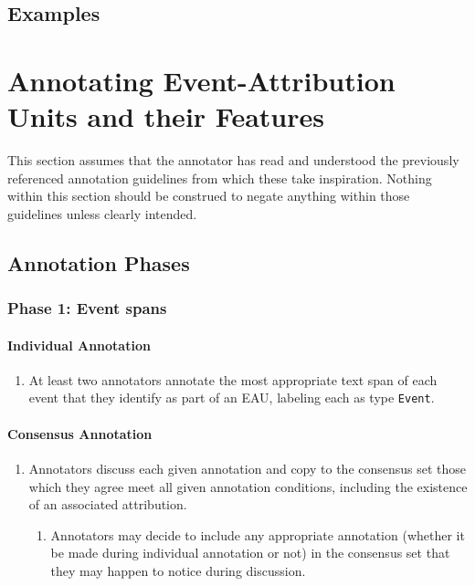 \documentclass[a4paper,12pt]{article}
\begin{document}
    \subsection{Examples}

\pagebreak
\section{Annotating Event-Attribution Units and their Features}

This section assumes that the annotator has read and understood the previously referenced annotation guidelines from which these take inspiration. Nothing within this section should be construed to negate anything within those guidelines unless clearly intended.

    \subsection{Annotation Phases}
    \subsubsection{Phase 1: Event spans}
    \paragraph{Individual Annotation}
        \begin{enumerate}
            \item At least two annotators annotate the most appropriate text span of each event that they identify as part of an EAU, labeling each as type \texttt{Event}.
        \end{enumerate}
    \paragraph{Consensus Annotation}
        \begin{enumerate}
            \item Annotators discuss each given annotation and copy to the consensus set those which they agree meet all given annotation conditions, including the existence of an associated attribution.
                \begin{enumerate}
                    \item Annotators may decide to include any appropriate annotation (whether it be made during individual annotation or not) in the consensus set that they may happen to notice during discussion.
                \end{enumerate}
        \end{enumerate}
\end{document}
